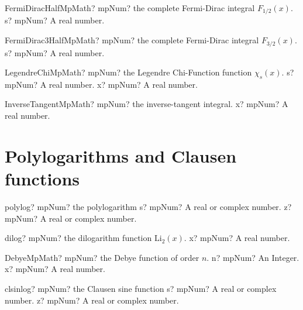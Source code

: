 \documentclass[12pt,a4paper,openany]{book}
\begin{document}
\begin{mpFunctionsExtract}
\mpFunctionOneNotImplemented
{FermiDiracHalfMpMath? mpNum? the complete Fermi-Dirac integral $F_{1/2}(x)$.}
{s? mpNum? A real number.}
\end{mpFunctionsExtract}

\begin{mpFunctionsExtract}
\mpFunctionOneNotImplemented
{FermiDirac3HalfMpMath? mpNum? the complete Fermi-Dirac integral $F_{3/2}(x)$.}
{s? mpNum? A real number.}
\end{mpFunctionsExtract}

\begin{mpFunctionsExtract}
\mpFunctionTwoNotImplemented
{LegendreChiMpMath? mpNum? the Legendre Chi-Function function $\chi_s(x)$.}
{s? mpNum? A real number.}
{x? mpNum? A real number.}
\end{mpFunctionsExtract}

\begin{mpFunctionsExtract}
\mpFunctionOneNotImplemented
{InverseTangentMpMath? mpNum? the inverse-tangent integral.}
{x? mpNum? A real number.}
\end{mpFunctionsExtract}

\section{Polylogarithms and Clausen functions}

\begin{mpFunctionsExtract}
\mpFunctionTwo
{polylog? mpNum? the polylogarithm}
{s? mpNum? A real or complex number.}
{z? mpNum? A real or complex number.}
\end{mpFunctionsExtract}

\begin{mpFunctionsExtract}
\mpFunctionOne
{dilog? mpNum? the dilogarithm function $\text{Li}_2(x)$.}
{x? mpNum? A real number.}
\end{mpFunctionsExtract}

\begin{mpFunctionsExtract}
\mpFunctionTwoNotImplemented
{DebyeMpMath? mpNum? the Debye function of order $n$.}
{n? mpNum? An Integer.}
{x? mpNum? A real number.}
\end{mpFunctionsExtract}

\begin{mpFunctionsExtract}
\mpFunctionTwo
{clsinlog? mpNum? the Clausen sine function}
{s? mpNum? A real or complex number.}
{z? mpNum? A real or complex number.}
\end{mpFunctionsExtract}
\end{document}
